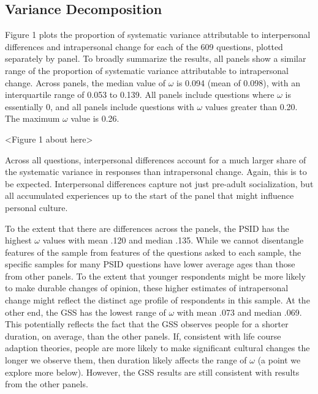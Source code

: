 \documentclass[
  12pt,
]{article}
\begin{document}
\hypertarget{variance-decomposition}{%
\subsection{Variance Decomposition}\label{variance-decomposition}}

Figure 1 plots the proportion of systematic variance attributable to
interpersonal differences and intrapersonal change for each of the 609
questions, plotted separately by panel. To broadly summarize the
results, all panels show a similar range of the proportion of systematic
variance attributable to intrapersonal change. Across panels, the median
value of \(\omega\) is 0.094 (mean of 0.098), with an interquartile
range of 0.053 to 0.139. All panels include questions where \(\omega\)
is essentially 0, and all panels include questions with \(\omega\)
values greater than 0.20. The maximum \(\omega\) value is 0.26.

\begin{center}
<Figure 1 about here>
\end{center}

Across all questions, interpersonal differences account for a much
larger share of the systematic variance in responses than intrapersonal
change. Again, this is to be expected. Interpersonal differences capture
not just pre-adult socialization, but all accumulated experiences up to
the start of the panel that might influence personal culture.

To the extent that there are differences across the panels, the PSID has
the highest \(\omega\) values with mean .120 and median .135. While we
cannot disentangle features of the sample from features of the questions
asked to each sample, the specific samples for many PSID questions have
lower average ages than those from other panels. To the extent that
younger respondents might be more likely to make durable changes of
opinion, these higher estimates of intrapersonal change might reflect
the distinct age profile of respondents in this sample. At the other
end, the GSS has the lowest range of \(\omega\) with mean .073 and
median .069. This potentially reflects the fact that the GSS observes
people for a shorter duration, on average, than the other panels. If,
consistent with life course adaption theories, people are more likely to
make significant cultural changes the longer we observe them, then
duration likely affects the range of \(\omega\) (a point we explore more
below). However, the GSS results are still consistent with results from
the other panels.
\end{document}
